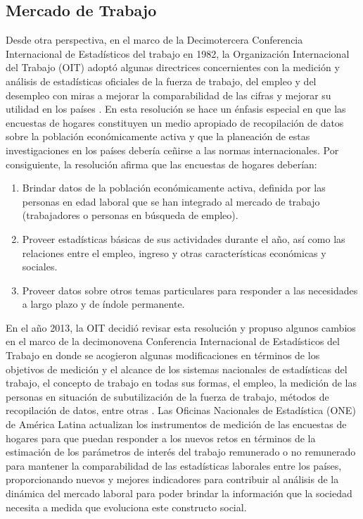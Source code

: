 \documentclass[
  12pt,
  spanish,
]{book}
\providecommand{\tightlist}{%
  \setlength{\itemsep}{0pt}\setlength{\parskip}{0pt}}
\begin{document}
\hypertarget{mercado-de-trabajo}{%
\subsection*{Mercado de Trabajo}\label{mercado-de-trabajo}}

Desde otra perspectiva, en el marco de la Decimotercera Conferencia Internacional de Estadísticos del trabajo en 1982, la Organización Internacional del Trabajo (OIT) adoptó algunas directrices concernientes con la medición y análisis de estadísticas oficiales de la fuerza de trabajo, del empleo y del desempleo con miras a mejorar la comparabilidad de las cifras y mejorar su utilidad en los países \citep{OIT_1982}. En esta resolución se hace un énfasis especial en que las encuestas de hogares constituyen un medio apropiado de recopilación de datos sobre la población económicamente activa y que la planeación de estas investigaciones en los países debería ceñirse a las normas internacionales. Por consiguiente, la resolución afirma que las encuestas de hogares deberían:

\begin{enumerate}
\def\labelenumi{\arabic{enumi}.}
\tightlist
\item
  Brindar datos de la población económicamente activa, definida por las personas en edad laboral que se han integrado al mercado de trabajo (trabajadores o personas en búsqueda de empleo).
\item
  Proveer estadísticas básicas de sus actividades durante el año, así como las relaciones entre el empleo, ingreso y otras características económicas y sociales.
\item
  Proveer datos sobre otros temas particulares para responder a las necesidades a largo plazo y de índole permanente.
\end{enumerate}

En el año 2013, la OIT decidió revisar esta resolución y propuso algunos cambios en el marco de la decimonovena Conferencia Internacional de Estadísticos del Trabajo en donde se acogieron algunas modificaciones en términos de los objetivos de medición y el alcance de los sistemas nacionales de estadísticas del trabajo, el concepto de trabajo en todas sus formas, el empleo, la medición de las personas en situación de subutilización de la fuerza de trabajo, métodos de recopilación de datos, entre otras \citep{OIT_2013}. Las Oficinas Nacionales de Estadística (ONE) de América Latina actualizan los instrumentos de medición de las encuestas de hogares para que puedan responder a los nuevos retos en términos de la estimación de los parámetros de interés del trabajo remunerado o no remunerado para mantener la comparabilidad de las estadísticas laborales entre los países, proporcionando nuevos y mejores indicadores para contribuir al análisis de la dinámica del mercado laboral para poder brindar la información que la sociedad necesita a medida que evoluciona este constructo social.
\end{document}
